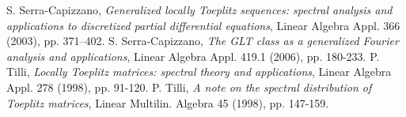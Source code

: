\documentclass{amsart}
\begin{document}
\begin{thebibliography}{}
 S. Serra-Capizzano, {\it Generalized locally Toeplitz sequences: spectral analysis and applications to discretized partial differential equations}, Linear Algebra Appl. 366 (2003), pp. 371–402.
%
 S. Serra-Capizzano, {\it The GLT class as a generalized Fourier analysis and applications}, Linear Algebra Appl. 419.1 (2006), pp. 180-233.
%
%
 P. Tilli, {\itshape Locally Toeplitz matrices: spectral theory and applications}, Linear Algebra Appl. 278 (1998), pp. 91-120.
%
 P. Tilli, {\itshape A note on the spectral distribution of Toeplitz matrices}, Linear Multilin. Algebra 45 (1998), pp. 147-159.
%
%
%
%

\end{thebibliography}{}
\end{document}
